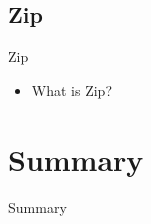 \documentclass{beamer}
\begin{document}
\subsection{Zip}
\begin{frame}[fragile]{Zip}
\begin{itemize}
\item{What is Zip?}
\end{itemize}
\end{frame}

\section{Summary}
\begin{frame}[fragile]{Summary}
\end{frame}
\end{document}
